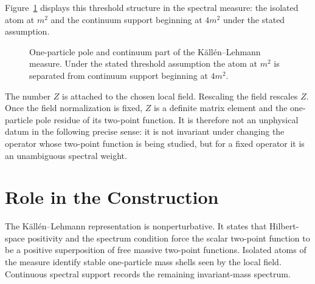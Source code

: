 Figure~\ref{fig:kallen-lehmann-pole-and-continuum} displays this threshold
structure in the spectral measure: the isolated atom at \(m^2\) and the
continuum support beginning at \(4m^2\) under the stated assumption.

\begin{figure}[H]
\centering
{}
\caption{One-particle pole and continuum part of the K\"all\'en--Lehmann
measure.  Under the stated threshold assumption the atom at \(m^2\) is
separated from continuum support beginning at \(4m^2\).}
\label{fig:kallen-lehmann-pole-and-continuum}
\end{figure}

The number \(Z\) is attached to the chosen local field. Rescaling the field
rescales \(Z\). Once the field normalization is fixed, \(Z\) is a definite
matrix element and the one-particle pole residue of its two-point function.
It is therefore not an unphysical datum in the following precise sense: it is
not invariant under changing the operator whose two-point function is being
studied, but for a fixed operator it is an unambiguous spectral weight.

\section{Role in the Construction}

The K\"all\'en--Lehmann representation is nonperturbative. It states that
Hilbert-space positivity and the spectrum condition force the scalar
two-point function to be a positive superposition of free massive two-point
functions. Isolated atoms of the measure identify stable one-particle mass
shells seen by the local field. Continuous spectral support records the
remaining invariant-mass spectrum.


